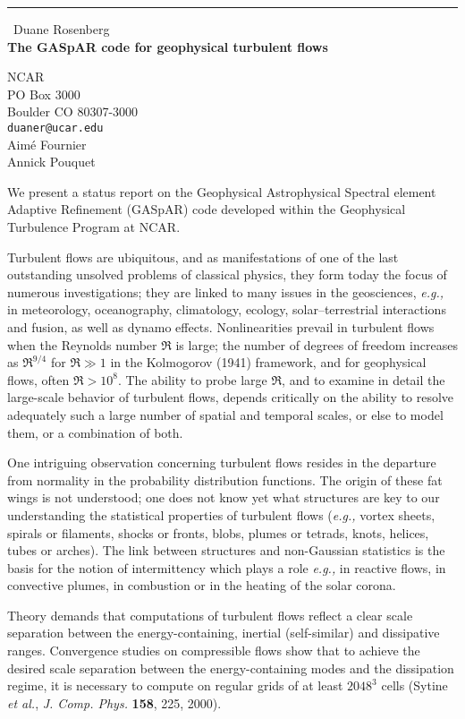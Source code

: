 \documentclass{report}
\begin{document}
\begin{center}
\rule{6in}{1pt} \
{\large Duane Rosenberg \\
{\bf The GASpAR code for geophysical turbulent flows}}

NCAR \\ PO Box 3000 \\ Boulder CO 80307-3000
\\
{\tt duaner@ucar.edu}\\
Aim\'e Fournier\\
Annick Pouquet\end{center}



We present a status report on the Geophysical Astrophysical Spectral element
Adaptive Refinement (GASpAR) code developed within the Geophysical
Turbulence Program at NCAR.

Turbulent flows are ubiquitous, and as manifestations of one of the
last outstanding unsolved problems of classical physics, they form
today the focus of numerous investigations; they
are linked to many issues in the geosciences, {\it e.g.,} in meteorology,
oceanography, climatology, ecology, solar--terrestrial interactions
and fusion, as well as dynamo effects.
Nonlinearities prevail in turbulent flows when the
Reynolds number $\Re$
is large; the number of degrees of freedom increases as
$\Re^{9/4}$ for $\Re\gg1$ in the Kolmogorov (1941) framework,
and for geophysical flows, often $\Re> 10^8$.
The ability to probe large $\Re$, and to examine in detail the
large-scale behavior of turbulent flows, depends
critically on the ability to resolve adequately such a large number of
spatial and temporal scales, or else to model them, or a combination of both.

One intriguing observation concerning turbulent flows
resides in the
departure from normality in the probability distribution
functions. The origin of these fat wings is not understood;
one does not know yet what structures are key to our
understanding the statistical properties of turbulent flows ({\it e.g.,}
vortex sheets, spirals or filaments,
shocks or fronts, blobs, plumes or tetrads, knots, helices, tubes or
arches).
The link between structures and non-Gaussian statistics is the basis
for the notion of intermittency which plays a role {\it e.g.,} in
reactive flows, in convective plumes, in combustion or in the heating of
the solar corona.

Theory demands that computations of turbulent flows
reflect a clear scale separation between the energy-containing,
inertial (self-similar) and dissipative ranges. Convergence
studies on compressible flows show that to achieve the desired
scale separation between the
energy-containing modes and the dissipation regime, it is necessary to
compute on regular grids of at least $2048^3$ cells (Sytine {\it et
al.}, {\it J. Comp. Phys.} {\bf 158}, 225, 2000).
\end{document}
